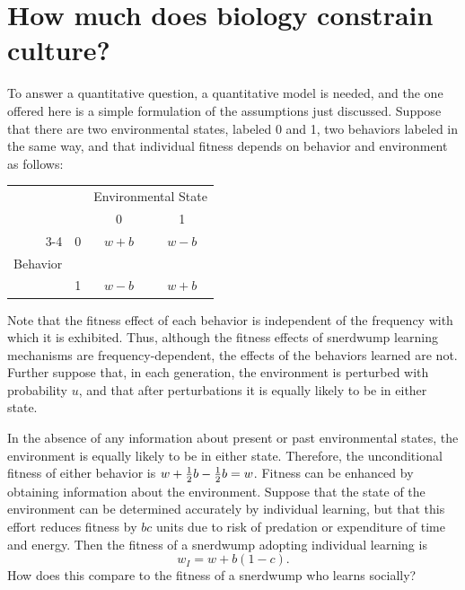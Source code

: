 \documentclass[11pt]{article}
\begin{document}
\section{How much does biology constrain culture?}

To answer a quantitative question, a quantitative model is needed,
and the one offered here is a simple formulation of the assumptions just
discussed.  Suppose that there are two environmental states, labeled 0 and
1, two behaviors labeled in the same way, and that individual fitness
depends on behavior and environment as follows:
\begin{center}
\begin{tabular}{rccc}
        &    & \multicolumn{2}{c}{Environmental State}\\
\multicolumn{2}{c}{} &   0      &      1 \\ \cline{3-4}
        & 0  & $w + b$  &   $w - b$\\
Behavior \\
        & 1  & $w - b$  &   $w + b$
\end{tabular}
\end{center}
Note that the fitness effect of each behavior is independent of the
frequency with which it is exhibited.  Thus, although the fitness effects
of snerdwump learning mechanisms are frequency-dependent, the effects
of the behaviors learned are not.  Further suppose that, in each
generation, the environment is perturbed with probability $u$, and that
after perturbations it is equally likely to be in either state.  

In the absence of any information about present or past environmental
states, the environment is equally likely to be in either state.
Therefore, the unconditional fitness of either behavior is
$w+ {1\over 2}b-{1\over 2}b=w$.
Fitness can be enhanced by obtaining information about the environment.
Suppose that the state of the environment can be determined accurately by
individual learning, but that this effort reduces fitness by $bc$ units
due to risk of predation or expenditure of time and energy.  Then the
fitness of a snerdwump adopting individual learning is
\begin{equation} \label{wI}
w_I =w+b(1-c) .
\end{equation}
How does this compare to the fitness of a snerdwump who learns socially?
\end{document}
